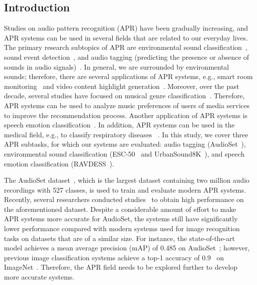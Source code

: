 \documentclass{article}
\begin{document}
\begin{sloppy}
\section{Introduction}
Studies on audio pattern recognition (APR) have been gradually increasing, and APR systems can be used in several fields that are related to our everyday lives. The primary research subtopics of APR are environmental sound classification~\cite{10.1145/2733373.2806390, 10.1145/2647868.2655045}, sound event detection~\cite{Turpault2019_DCASE}, and audio tagging (predicting the presence or absence of sounds in audio signals)~\cite{7952261}. In general, we are surrounded by environmental sounds; therefore, there are several applications of APR systems, e.g., smart room monitoring~\cite{cite6} and video content highlight generation~\cite{5202537}. Moreover, over the past decade, several studies have focused on musical genre classification~\cite{1021072}. Therefore, APR systems can be used to analyze music preferences of users of media services to improve the recommendation process. Another application of APR systems is speech emotion classification~\cite{Livingstone2018TheRA}. In addition, APR systems can be used in the medical field, e.g., to classify respiratory diseases ~\cite{10.1007/978-981-10-7419-6_6}. In this study, we cover three APR subtasks, for which our systems are evaluated: audio tagging (AudioSet~\cite{7952261}), environmental sound classification (\hbox{ESC-50~\cite{10.1145/2733373.2806390}} and UrbanSound8K~\cite{10.1145/2647868.2655045}), and speech emotion classification (RAVDESS~\cite{Livingstone2018TheRA}).

The AudioSet dataset~\cite{7952261}, which is the largest dataset containing two million audio recordings with 527 classes, is used to train and evaluate modern APR systems. Recently, several researchers conducted studies~\cite{gong21b_interspeech, 9229505, 9414229, Guzhov2021ESResNeXtfbspLR} to obtain high performance on the aforementioned dataset. Despite a considerable amount of effort to make APR systems more accurate for AudioSet, the systems still have significantly lower performance compared with modern systems used for image recognition tasks on datasets that are of a similar size. For instance, the state-of-the-art model achieves a mean average precision (mAP) of 0.485 on AudioSet~\cite{gong21b_interspeech}; however, previous image classification systems achieve a top-1 accuracy of 0.9~\cite{Pham_2021_CVPR} on ImageNet~\cite{5206848}. Therefore, the APR field needs to be explored further to develop more accurate systems.


\end{sloppy}
\end{document}
